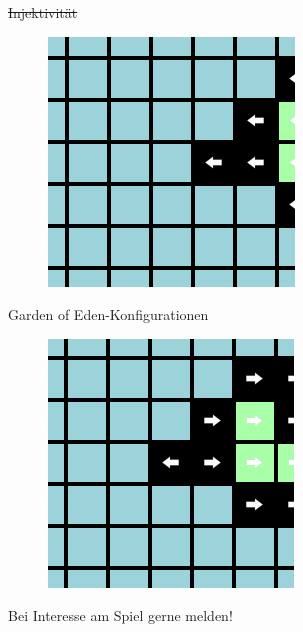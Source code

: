 \documentclass[aspectratio=169]{beamer}
\begin{document}
\begin{frame}{\sout{Injektivität}}
\begin{multicols*}{5}
      \begin{figure}[H]
        \centering
        \includegraphics[width = 0.35 \textheight]{example4_2.png}
      \end{figure}

    \end{multicols*}
  \end{frame}


  \begin{frame}{Garden of Eden-Konfigurationen}
    \begin{figure}[H]
      \centering
      \includegraphics[width = 0.55 \textheight]{example5.png}
    \end{figure}
  \end{frame}


  \begin{frame}{}
    \begin{block}{}

      {
          \centering
          \huge
          Bei Interesse am Spiel gerne melden!
      }

    \end{block}

  \end{frame}
\end{document}
